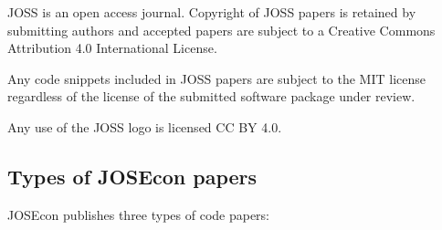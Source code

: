 JOSS is an open access journal. Copyright of JOSS papers is retained by submitting authors and accepted papers are subject to a Creative Commons Attribution 4.0 International License.

Any code snippets included in JOSS papers are subject to the MIT license regardless of the license of the submitted software package under review.

Any use of the JOSS logo is licensed CC BY 4.0.


\subsection{Types of JOSEcon papers}

JOSEcon publishes three types of code papers:

